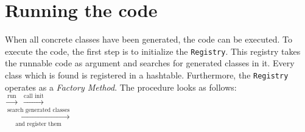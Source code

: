 	\section{Running the code}
		When all concrete classes have been generated, the code can be executed. To execute the code,
		the first step is to initialize the \verb~Registry~. This registry takes the runnable
		code as argument and searches for generated classes in it. Every class which is found
		is registered in a hashtable. Furthermore, the \verb~Registry~ operates as a
		\textit{Factory Method}. The procedure looks as follows:\\[2mm]
		
			\noindent
				$\xrightarrow{\text{run}}$ 
				$\xrightarrow{\text{call init}}$
				\\[2mm]
				$\xrightarrow[\text{and register them}]{\text{search generated classes}}$
				\\[2mm]
				